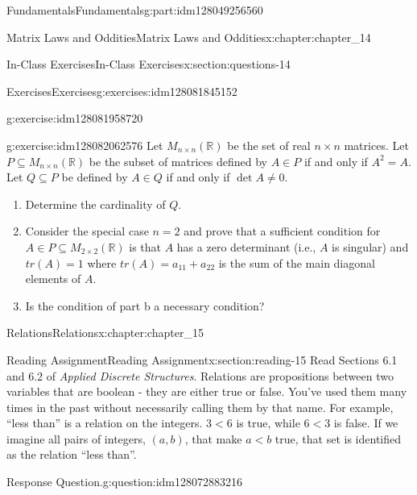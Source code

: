 \documentclass[oneside,10pt,]{book}
\numberwithin{equation}{section}
\newcommand{\lt}{<}
\begin{document}
\begin{partptx}{Fundamentals}{}{Fundamentals}{}{}{g:part:idm128049256560}
\begin{chapterptx}{Matrix Laws and Oddities}{}{Matrix Laws and Oddities}{}{}{x:chapter:chapter_14}
\begin{sectionptx}{In-Class Exercises}{}{In-Class Exercises}{}{}{x:section:questions-14}
\begin{exercises-subsection}{Exercises}{}{Exercises}{}{}{g:exercises:idm128081845152}
\begin{exercisegroup}
\begin{divisionexerciseeg}{3}{}{}{g:exercise:idm128081958720}
\end{divisionexerciseeg}%
\begin{divisionexerciseeg}{4}{}{}{g:exercise:idm128082062576}%
Let \(M_{n\times n}(\mathbb{R})\) be the set of real \(n\times n\) matrices. Let \(P \subseteq  M_{n\times n}(\mathbb{R})\) be the subset of matrices defined by \(A \in  P\) if and only if \(A^2 = A\). Let \(Q \subseteq  P\) be defined by \(A\in Q\) if and only if \(\det A \neq  0\).%
\par
%
\begin{enumerate}[label=(\alph*)]
\item{}Determine the cardinality of \(Q\).%
\item{}Consider the special case \(n = 2\) and prove that a sufficient condition for \(A \in  P \subseteq  M_{2\times 2}(\mathbb{R})\) is that \(A\) has a zero determinant (i.e., \(A\) is singular) and \(tr(A) = 1\) where \(tr(A) = a_{11}+ a _{22}\) is the sum of the main diagonal elements of \(A\).%
\item{}Is the condition of part b a necessary condition?%
\end{enumerate}
%
\end{divisionexerciseeg}%
\end{exercisegroup}
\par\medskip\noindent
\end{exercises-subsection}
\end{sectionptx}
\end{chapterptx}
%
\typeout{************************************************}
\typeout{************************************************}
%
\begin{chapterptx}{Relations}{}{Relations}{}{}{x:chapter:chapter_15}
\index{}%
%
%
\typeout{************************************************}
\typeout{************************************************}
%
\begin{sectionptx}{Reading Assignment}{}{Reading Assignment}{}{}{x:section:reading-15}
Read Sections 6.1 and 6.2 of \emph{Applied Discrete Structures}.  Relations are propositions between two variables that are boolean - they are either true or false.   You've used them many times in the past without necessarily calling them by that name.  For example, ``less than'' is a relation on the integers.  \(3 \lt 6\) is true, while \(6 \lt 3\) is false.  If we imagine all pairs of integers, \((a,b)\), that make \(a \lt b\)  true, that set is identified as the relation ``less than''.%
\begin{question}{Response Question.}{g:question:idm128072883216}%

\end{question}
\end{sectionptx}
\end{chapterptx}
\end{partptx}
\end{document}
